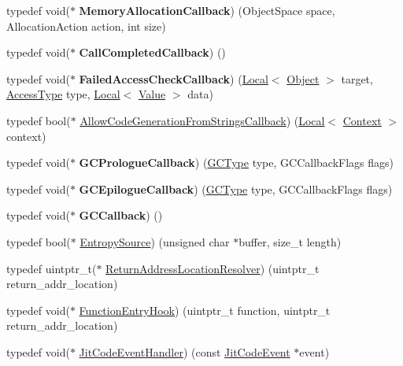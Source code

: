 \begin{DoxyCompactItemize}
\item 
\hypertarget{namespacev8_a2402a6535cafc5f721192b300502fb0a}{}typedef void($\ast$ {\bfseries Memory\+Allocation\+Callback}) (Object\+Space space, Allocation\+Action action, int size)\label{namespacev8_a2402a6535cafc5f721192b300502fb0a}

\item 
\hypertarget{namespacev8_a8d88696ff21bd777d488605cb7714573}{}typedef void($\ast$ {\bfseries Call\+Completed\+Callback}) ()\label{namespacev8_a8d88696ff21bd777d488605cb7714573}

\item 
\hypertarget{namespacev8_a1352a0d6e487b7092ea79e2d3d4ecd12}{}typedef void($\ast$ {\bfseries Failed\+Access\+Check\+Callback}) (\hyperlink{classv8_1_1_local}{Local}$<$ \hyperlink{classv8_1_1_object}{Object} $>$ target, \hyperlink{namespacev8_add8bef6469c5b94706584124e610046c}{Access\+Type} type, \hyperlink{classv8_1_1_local}{Local}$<$ \hyperlink{classv8_1_1_value}{Value} $>$ data)\label{namespacev8_a1352a0d6e487b7092ea79e2d3d4ecd12}

\item 
typedef bool($\ast$ \hyperlink{namespacev8_a521d909ec201742a1cb35d50a8e2a3c2}{Allow\+Code\+Generation\+From\+Strings\+Callback}) (\hyperlink{classv8_1_1_local}{Local}$<$ \hyperlink{classv8_1_1_context}{Context} $>$ context)
\item 
\hypertarget{namespacev8_a09e509ff7a94ad074420980c5f5762af}{}typedef void($\ast$ {\bfseries G\+C\+Prologue\+Callback}) (\hyperlink{namespacev8_ac109d6f27e0c0f9ef4e98bcf7a806cf2}{G\+C\+Type} type, G\+C\+Callback\+Flags flags)\label{namespacev8_a09e509ff7a94ad074420980c5f5762af}

\item 
\hypertarget{namespacev8_a4a818ae1aee0cb378a4c2037dfc4a4c2}{}typedef void($\ast$ {\bfseries G\+C\+Epilogue\+Callback}) (\hyperlink{namespacev8_ac109d6f27e0c0f9ef4e98bcf7a806cf2}{G\+C\+Type} type, G\+C\+Callback\+Flags flags)\label{namespacev8_a4a818ae1aee0cb378a4c2037dfc4a4c2}

\item 
\hypertarget{namespacev8_a226458957ce3c253b9a9f539bb5ddad4}{}typedef void($\ast$ {\bfseries G\+C\+Callback}) ()\label{namespacev8_a226458957ce3c253b9a9f539bb5ddad4}

\item 
typedef bool($\ast$ \hyperlink{namespacev8_ab699f4bbbb56350e6e915682e420fcdc}{Entropy\+Source}) (unsigned char $\ast$buffer, size\+\_\+t length)
\item 
typedef uintptr\+\_\+t($\ast$ \hyperlink{namespacev8_a8ce54c75241be41ff6a25e9944eefd2a}{Return\+Address\+Location\+Resolver}) (uintptr\+\_\+t return\+\_\+addr\+\_\+location)
\item 
typedef void($\ast$ \hyperlink{namespacev8_aaf07fb6bb13f295da3c6568938b7dec5}{Function\+Entry\+Hook}) (uintptr\+\_\+t function, uintptr\+\_\+t return\+\_\+addr\+\_\+location)
\item 
typedef void($\ast$ \hyperlink{namespacev8_a39243bc91e63d64d111452fdb98c4733}{Jit\+Code\+Event\+Handler}) (const \hyperlink{structv8_1_1_jit_code_event}{Jit\+Code\+Event} $\ast$event)
\end{DoxyCompactItemize}
